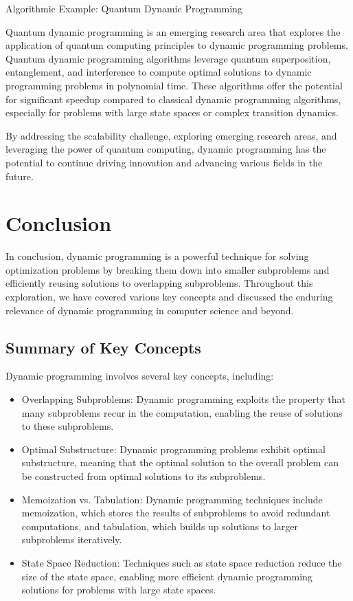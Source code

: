 \documentclass[12pt]{book} %
\begin{document}
Algorithmic Example: Quantum Dynamic Programming

Quantum dynamic programming is an emerging research area that explores the application of quantum computing principles to dynamic programming problems. Quantum dynamic programming algorithms leverage quantum superposition, entanglement, and interference to compute optimal solutions to dynamic programming problems in polynomial time. These algorithms offer the potential for significant speedup compared to classical dynamic programming algorithms, especially for problems with large state spaces or complex transition dynamics.

By addressing the scalability challenge, exploring emerging research areas, and leveraging the power of quantum computing, dynamic programming has the potential to continue driving innovation and advancing various fields in the future.


\section{Conclusion}

In conclusion, dynamic programming is a powerful technique for solving optimization problems by breaking them down into smaller subproblems and efficiently reusing solutions to overlapping subproblems. Throughout this exploration, we have covered various key concepts and discussed the enduring relevance of dynamic programming in computer science and beyond.

\subsection{Summary of Key Concepts}

Dynamic programming involves several key concepts, including:
\begin{itemize}
    \item Overlapping Subproblems: Dynamic programming exploits the property that many subproblems recur in the computation, enabling the reuse of solutions to these subproblems.
    \item Optimal Substructure: Dynamic programming problems exhibit optimal substructure, meaning that the optimal solution to the overall problem can be constructed from optimal solutions to its subproblems.
    \item Memoization vs. Tabulation: Dynamic programming techniques include memoization, which stores the results of subproblems to avoid redundant computations, and tabulation, which builds up solutions to larger subproblems iteratively.
    \item State Space Reduction: Techniques such as state space reduction reduce the size of the state space, enabling more efficient dynamic programming solutions for problems with large state spaces.
\end{itemize}
\end{document}

